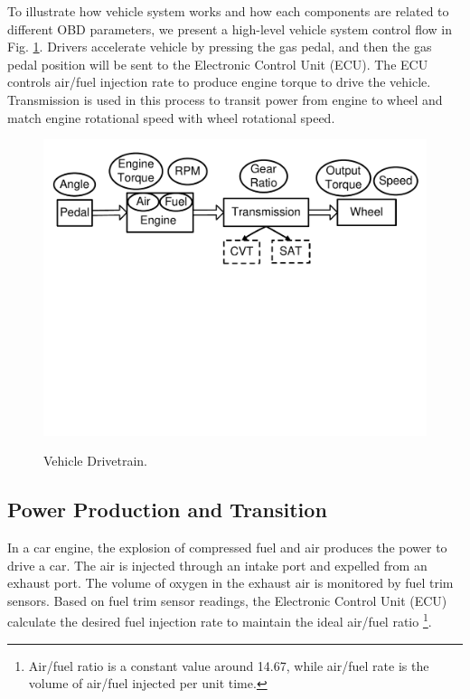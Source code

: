 



To illustrate how vehicle system works 
and how each components are related to different OBD parameters,
we present a high-level vehicle system control 
flow in Fig. \ref{vehicle_system}. 
Drivers accelerate vehicle by pressing the gas pedal, 
and then the gas pedal position will be sent to 
the Electronic Control Unit (ECU). 
The ECU controls air/fuel injection rate
to produce engine torque to drive the vehicle.   
Transmission is used in this process 
to transit power from engine to wheel and 
match engine rotational speed with wheel rotational speed. 


\begin{figure}[t]
\begin{center}
\vspace{-0.0cm}
\includegraphics[width=5.0in,angle=0]{Figs/EcoDrive/drivetrain.pdf}
\vspace{-5.5cm}
\caption{Vehicle Drivetrain.}
\vspace{-0.5cm}
\label{vehicle_system}
\end{center}
\end{figure}


\subsection{Power Production and Transition}

In a car engine, the explosion of compressed fuel and air 
produces the power to drive a car.
The air is injected through an intake port and expelled from an exhaust port.
The volume of oxygen in the exhaust air is monitored by fuel trim sensors. 
Based on fuel trim sensor readings, the Electronic Control Unit (ECU) 
calculate the desired fuel injection rate to maintain the
ideal air/fuel ratio 
\footnote{Air/fuel ratio is a constant value around 14.67, 
while air/fuel rate is the volume of air/fuel injected per unit time.}. 



